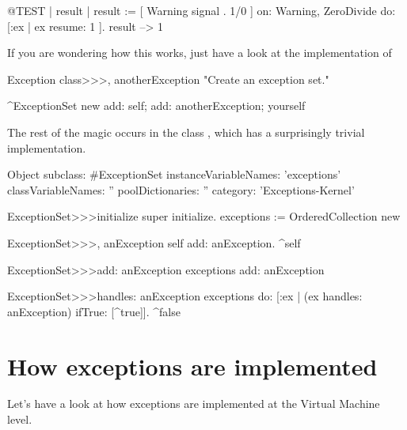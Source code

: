 \documentclass[a4paper,10pt,twoside]{book}
\begin{document}
\begin{code}{@TEST | result |}
result := [ Warning signal . 1/0 ]
	on: Warning, ZeroDivide
	do: [:ex | ex resume: 1 ].
result --> 1
\end{code}

If you are wondering how this works, just have a look at the implementation of 

\begin{code}{}
Exception class>>>, anotherException
	"Create an exception set."

	^ExceptionSet new
		add: self;
		add: anotherException;
		yourself
\end{code}

The rest of the magic occurs in the class , which has a surprisingly trivial implementation.

\begin{code}{}
Object subclass: #ExceptionSet
	instanceVariableNames: 'exceptions'
	classVariableNames: ''
	poolDictionaries: ''
	category: 'Exceptions-Kernel'

ExceptionSet>>>initialize
	super initialize.
	exceptions := OrderedCollection new

ExceptionSet>>>, anException
	self add: anException.
	^self

ExceptionSet>>>add: anException
	exceptions add: anException

ExceptionSet>>>handles: anException
	exceptions do: [:ex | (ex handles: anException) ifTrue: [^true]].
	^false
\end{code}

\noindent
{}

\section{How exceptions are implemented}


Let's have a look at how exceptions are implemented at the Virtual Machine level.


\end{document}
